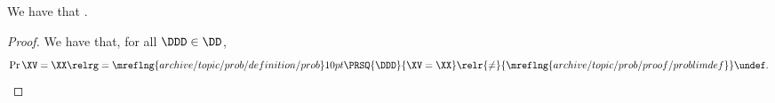 \begin{proposition}
  We have that \pproblimdefprop.%
\end{proposition}

\begin{proof}
  We have that, for all $\DDD \in \DD$,
    $$ \Pr{\XV = \XX} \relrg = {\mreflng{archive/topic/prob/definition/prob}} 10pt
                    \PRSQ{\DDD}{\XV = \XX}
                    \relr {\ne} {\mreflng{archive/topic/prob/proof/problimdef}}
                    \undef.$$%
\end{proof}
